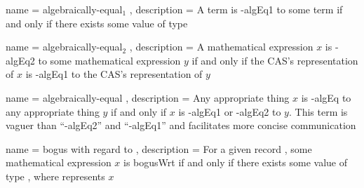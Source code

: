 \documentclass{report}
\begin{document}
  { name = algebraically-equal\({}_1\)
  , description = A term  is -\gls{algEq1} to some term  if and only if there exists some value of type    
  }

  { name = algebraically-equal\({}_2\)
  , description = A mathematical expression \(x\) is -\gls{algEq2} to some mathematical expression \(y\) if and only if the  CAS's representation of \(x\) is -\gls{algEq1} to the  CAS's representation of \(y\)
  }

  { name = algebraically-equal
  , description = Any appropriate thing \(x\) is -\gls{algEq} to any appropriate thing \(y\) if and only if \(x\) is -\gls{algEq1} or -\gls{algEq2} to \(y\).  This term is vaguer than ``-\gls{algEq2}'' and ``-\gls{algEq1}'' and facilitates more concise communication
  }

  { name = bogus with regard to
  , description = {For a given  record , some mathematical expression \(x\) is \gls{bogusWrt}  if and only if there exists some value of type   , where  represents \(x\)}
  }

\clearpage{}

\printglossary{}
\end{document}

